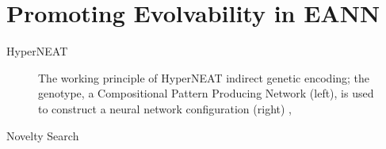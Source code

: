 \section{Promoting Evolvability in EANN} \label{sec:eann}

\begin{frame}{HyperNEAT}
\begin{figure}
	
    \captionsetup{singlelinecheck=off,justification=raggedright}
    \vspace{-4ex}
  	\caption{The working principle of HyperNEAT indirect genetic encoding; the genotype, a Compositional Pattern Producing Network (left), is used to construct a neural network configuration (right) \cite{Ha2015Neurogram}, \cite[Figure 15]{Clune2011OnRegularity}}
\end{figure}
\end{frame}

\begin{frame}{Novelty Search}
   
\end{frame}